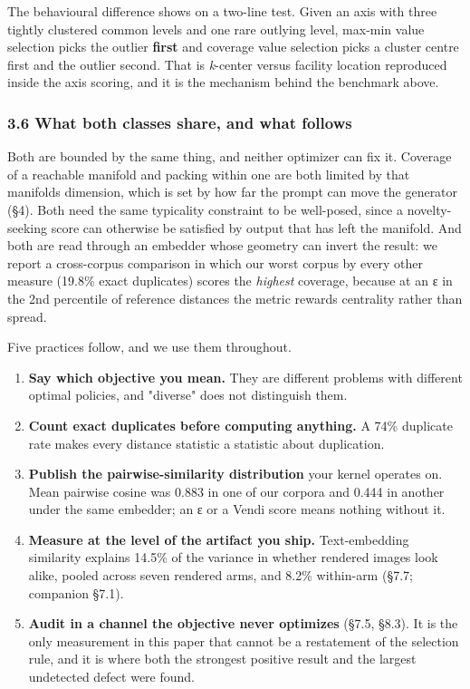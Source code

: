\documentclass[
  10pt,
]{article}
\providecommand{\tightlist}{%
  \setlength{\itemsep}{0pt}\setlength{\parskip}{0pt}}
\theoremstyle{plain}
\theoremstyle{definition}
\providecommand{\tightlist}{\setlength{\itemsep}{0pt}\setlength{\parskip}{0pt}}
\begin{document}
The behavioural difference shows on a two-line test. Given an axis with
three tightly clustered common levels and one rare outlying level,
max-min value selection picks the outlier \textbf{first} and coverage
value selection picks a cluster centre first and the outlier second.
That is \emph{k}-center versus facility location reproduced inside the
axis scoring, and it is the mechanism behind the benchmark above.

\subsubsection{3.6 What both classes share, and what
follows}\label{36-what-both-classes-share-and-what-follows}

Both are bounded by the same thing, and neither optimizer can fix it.
Coverage of a reachable manifold and packing within one are both limited
by that manifold\textquotesingle s dimension, which is set by how far
the prompt can move the generator (§4). Both need the same typicality
constraint to be well-posed, since a novelty-seeking score can otherwise
be satisfied by output that has left the manifold. And both are read
through an embedder whose geometry can invert the result: we report a
cross-corpus comparison in which our worst corpus by every other measure
(19.8\% exact duplicates) scores the \emph{highest} coverage, because at
an ε in the 2nd percentile of reference distances the metric rewards
centrality rather than spread.

Five practices follow, and we use them throughout.

\begin{enumerate}
\def\labelenumi{\arabic{enumi}.}
\tightlist
\item
  \textbf{Say which objective you mean.} They are different problems
  with different optimal policies, and "diverse" does not distinguish
  them.
\item
  \textbf{Count exact duplicates before computing anything.} A 74\%
  duplicate rate makes every distance statistic a statistic about
  duplication.
\item
  \textbf{Publish the pairwise-similarity distribution} your kernel
  operates on. Mean pairwise cosine was 0.883 in one of our corpora and
  0.444 in another under the same embedder; an ε or a Vendi score means
  nothing without it.
\item
  \textbf{Measure at the level of the artifact you ship.} Text-embedding
  similarity explains 14.5\% of the variance in whether rendered images
  look alike, pooled across seven rendered arms, and 8.2\% within-arm
  (§7.7; companion §7.1).
\item
  \textbf{Audit in a channel the objective never optimizes} (§7.5,
  §8.3). It is the only measurement in this paper that cannot be a
  restatement of the selection rule, and it is where both the strongest
  positive result and the largest undetected defect were found.
\end{enumerate}
\end{document}
